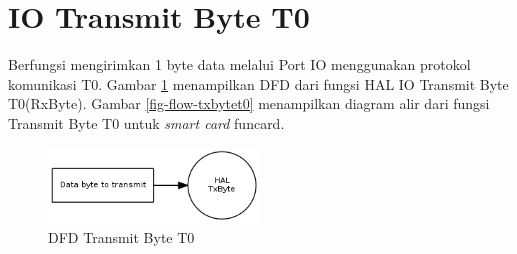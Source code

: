 \section{IO Transmit Byte T0}
\label{sec_txbytet0}

Berfungsi mengirimkan 1 byte data melalui Port IO menggunakan protokol komunikasi T0. Gambar \ref{fig-dfd-txbytet0} menampilkan DFD dari fungsi HAL IO Transmit Byte T0(RxByte). Gambar \ref{fig-flow-txbytet0} menampilkan diagram alir dari fungsi Transmit Byte T0 untuk \emph{smart card} funcard.

\begin{figure}[!h]
\centering
\includegraphics[width=0.5\textwidth]{image/hal/dfd_txbytet0.png}
\caption{DFD Transmit Byte T0}
\label{fig-dfd-txbytet0}
\end{figure}

